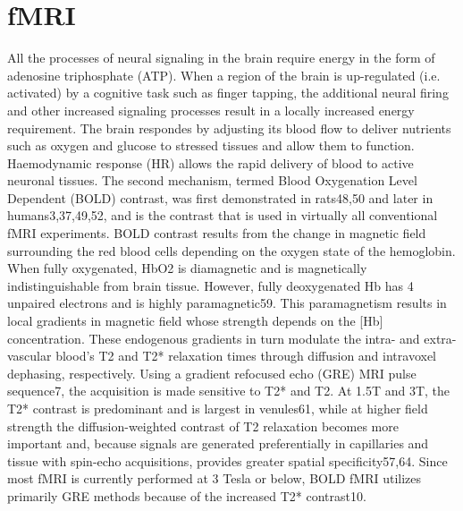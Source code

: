 \section{fMRI}
\cite{Glover2011}
All the processes of neural signaling in the brain require energy in the form of adenosine triphosphate (ATP).
When a region of the brain is up-regulated (i.e. activated) by a cognitive task such as finger tapping, the additional neural firing and other increased signaling processes result in a locally increased energy requirement.
The brain respondes by adjusting its blood flow to deliver nutrients such as oxygen and glucose to stressed tissues and allow them to function. Haemodynamic response (HR) allows the rapid delivery of blood to active neuronal tissues.
The second mechanism, termed Blood Oxygenation Level Dependent (BOLD) contrast, was first demonstrated in rats48,50 and later in humans3,37,49,52, and is the contrast that is used in virtually all conventional fMRI experiments. BOLD contrast results from the change in magnetic field surrounding the red blood cells depending on the oxygen state of the hemoglobin. When fully oxygenated, HbO2 is diamagnetic and is magnetically indistinguishable from brain tissue. However, fully deoxygenated Hb has 4 unpaired electrons and is highly paramagnetic59. This paramagnetism results in local gradients in magnetic field whose strength depends on the [Hb] concentration. These endogenous gradients in turn modulate the intra- and extra-vascular blood’s T2 and T2* relaxation times through diffusion and intravoxel dephasing, respectively. Using a gradient refocused echo (GRE) MRI pulse sequence7, the acquisition is made sensitive to T2* and T2. At 1.5T and
3T, the T2* contrast is predominant and is largest in venules61, while at higher field strength the diffusion-weighted contrast of T2 relaxation becomes more important and, because signals are generated preferentially in capillaries and tissue with spin-echo acquisitions, provides greater spatial specificity57,64. Since most fMRI is currently performed at 3 Tesla or below, BOLD fMRI utilizes primarily GRE methods because of the increased T2* contrast10.

